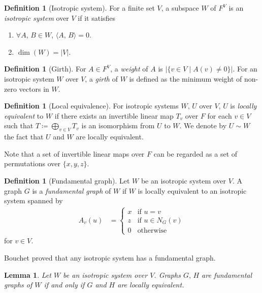 \documentclass[twoside,10pt]{article}
\newtheorem{lemma}[theorem]{Lemma}
\theoremstyle{definition}
\newtheorem{definition}[theorem]{Definition}
\theoremstyle{remark}
\begin{document}
\begin{definition}[Isotropic system]
For a finite set $V$, a subspace $W$ of $F^V$ is an \textit{isotropic system} over $V$ if it satisfies
\begin{enumerate}
\item $\forall A,\,B\in W$, $\langle A,\,B\rangle = 0$.
\item $\dim(W) = |V|$.
\end{enumerate}
\end{definition}

\begin{definition}[Girth]
For $A\in F^V$, a \textit{weight} of $A$ is $|\{v\in V\mid A(v)\ne 0\}|$.
For an isotropic system $W$ over $V$, a \textit{girth} of $W$ is defined as the minimum weight of non-zero vectors in $W$.
\end{definition}

\begin{definition}[Local equivalence]
For isotropic systems $W,\,U$ over $V$, $U$ is \textit{locally equivalent} to $W$ if there exists an invertible linear map $T_v$ over $F$ for each $v\in V$ such that $T\coloneqq \bigoplus_{v\in V}T_v$ is an isomorphism from $U$ to $W$.
We denote by $U\sim W$ the fact that $U$ and $W$ are locally equivalent.
\end{definition}
Note that a set of invertible linear maps over $F$ can be regarded as a set of permutations over $\{x,y,z\}$.

\begin{definition}[Fundamental graph]
Let $W$ be an isotropic system over $V$.
A graph $G$ is a \textit{fundamental graph} of $W$ if $W$ is locally equivalent to an isotropic system spanned by
\begin{align*}
A_v(u) &=
\begin{cases}
 x& \text{if } u = v\\
 z& \text{if } u\in N_G(v)\\
 0& \text{otherwise}
\end{cases}
\end{align*}
for $v\in V$.
\end{definition}

Bouchet proved that any isotropic system has a fundamental graph.

\begin{lemma}
Let $W$ be an isotropic system over $V$.
Graphs $G,\,H$ are fundamental graphs of $W$ if and only if $G$ and $H$ are locally equivalent.
\end{lemma}
\end{document}
